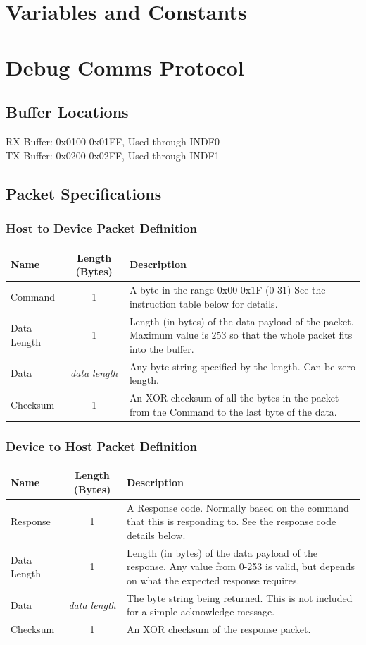\documentclass[a4paper,10pt]{book}
\begin{document}
\chapter{Variables and Constants}


\chapter{Debug Comms Protocol}
\label{chap:comms}
\section{Buffer Locations}
RX Buffer: 0x0100-0x01FF, Used through INDF0\\
TX Buffer: 0x0200-0x02FF, Used through INDF1

\section{Packet Specifications}
\subsection{Host to Device Packet Definition}
\begin{tabular}{l|c|p{6cm}}
 \textbf{Name}&\textbf{Length (Bytes)}&\textbf{Description}\\
\hline
 Command&1&A byte in the range 0x00-0x1F (0-31) See the instruction table below for details.\\
\hline
 Data Length&1&Length (in bytes) of the data payload of the packet.  Maximum value is 253 so that the whole packet fits into the buffer.\\
\hline
 Data&\textit{data length}&Any byte string specified by the length.  Can be zero length.\\
\hline
 Checksum&1&An XOR checksum of all the bytes in the packet from the Command to the last byte of the data.\\
\end{tabular}

\subsection{Device to Host Packet Definition}
\begin{tabular}{l|c|p{6cm}}
 \textbf{Name}&\textbf{Length (Bytes)}&\textbf{Description}\\
\hline
 Response&1&A Response code.  Normally based on the command that this is responding to.  See the response code details below.\\
\hline
 Data Length&1&Length (in bytes) of the data payload of the response.  Any value from 0-253 is valid, but depends on what the expected response requires.\\
\hline
 Data&\textit{data length}&The byte string being returned.  This is not included for a simple acknowledge message.\\
\hline
 Checksum&1&An XOR checksum of the response packet.\\
\end{tabular}
\end{document}
